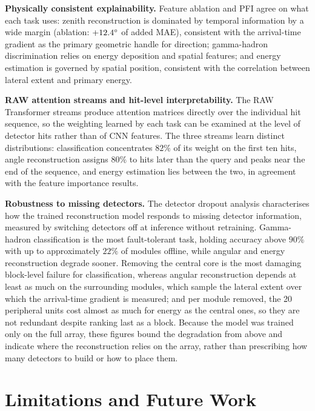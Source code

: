 \textbf{Physically consistent explainability.} Feature ablation and PFI agree on what each task uses: zenith reconstruction is dominated by temporal information by a wide margin (ablation: $+12.4\degree$ of added MAE), consistent with the arrival-time gradient as the primary geometric handle for direction; gamma-hadron discrimination relies on energy deposition and spatial features; and energy estimation is governed by spatial position, consistent with the correlation between lateral extent and primary energy.

\textbf{RAW attention streams and hit-level interpretability.} The RAW Transformer streams produce attention matrices directly over the individual hit sequence, so the weighting learned by each task can be examined at the level of detector hits rather than of CNN features. The three streams learn distinct distributions: classification concentrates $82\%$ of its weight on the first ten hits, angle reconstruction assigns $80\%$ to hits later than the query and peaks near the end of the sequence, and energy estimation lies between the two, in agreement with the feature importance results.

\textbf{Robustness to missing detectors.} The detector dropout analysis characterises how
the trained reconstruction model responds to missing detector information, measured by
switching detectors off at inference without retraining. Gamma-hadron classification is the most fault-tolerant task, holding accuracy above $90\%$ with up to approximately $22\%$ of modules offline, while angular and energy reconstruction degrade sooner. Removing the central core is the most damaging block-level failure for classification, whereas angular reconstruction depends at least as much on the surrounding modules, which sample the lateral extent over which the arrival-time gradient is measured; and per module removed, the 20 peripheral units cost almost as much for energy as the central ones, so they are not redundant despite ranking last as a block. Because the model was trained only on the full array, these figures bound the degradation from above and indicate where the reconstruction relies on the array, rather than prescribing how many detectors to build or how to place them.

\section{Limitations and Future Work}
\label{sec:limitations}
\label{sec:future}

